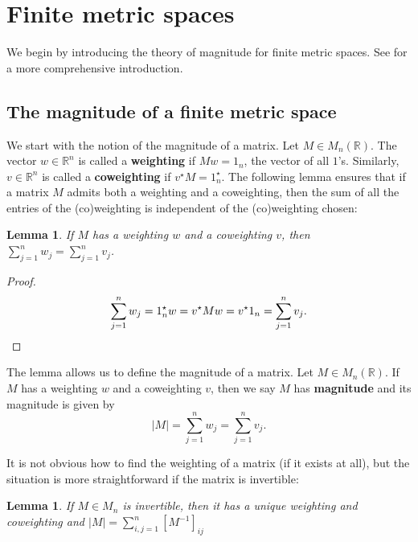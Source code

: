 \documentclass[11pt]{article}
\theoremstyle{mythm}
\newtheorem{lem}[defn]{Lemma}
\begin{document}
\section{Finite metric spaces}

We begin by introducing the theory of magnitude for finite metric spaces. See \cite{leinster_magnitude_2011} for a more comprehensive introduction.

\subsection{The magnitude of a finite metric space}

We start with the notion of the magnitude of a matrix. Let $M \in M_n(\mathbb{R})$. The vector $w \in \mathbb{R}^n$ is called a \textbf{weighting} if $Mw = 1_n$, the vector of all $1$'s. Similarly, $v \in \mathbb{R}^n$ is called a \textbf{coweighting} if $v^\star M = 1_n^\star$. The following lemma ensures that if a matrix $M$ admits both a weighting and a coweighting, then the sum of all the entries of the (co)weighting is independent of the (co)weighting chosen:

\begin{lem}\label{lem:indepweighting}
If $M$ has a weighting $w$ and a coweighting $v$, then $\sum\limits_{j=1}^{n}w_j = \sum\limits_{j=1}^{n}v_j$.
\end{lem}

\begin{proof}
\begin{equation*}
\sum\limits_{j=1}^{n}w_j = 1_n^\star w = v^\star Mw = v^\star 1_n = \sum\limits_{j=1}^{n}v_j. \qedhere
\end{equation*}
\end{proof}

The lemma allows us to define the magnitude of a matrix. Let $M \in M_n(\mathbb{R})$. If $M$ has a weighting $w$ and a coweighting $v$, then we say $M$ has \textbf{magnitude} and its magnitude is given by
\begin{equation*}
\vert M \vert = \sum\limits_{j=1}^{n} w_j = \sum\limits_{j=1}^{n}v_j.
\end{equation*}

It is not obvious how to find the weighting of a matrix (if it exists at all), but the situation is more straightforward if the matrix is invertible:

\begin{lem}\label{lem:inv}
If $M \in M_n$ is invertible, then it has a unique weighting and coweighting and $\vert M \vert = \sum\limits_{i,j=1}^{n}[M^{-1}]_{ij}$
\end{lem}
\end{document}
